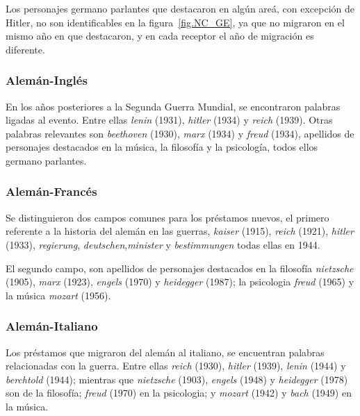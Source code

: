 Los personajes germano parlantes que destacaron en algún areá, con excepción de Hitler, no son identificables en la figura~\ref{fig.NC_GE}, ya que no migraron en el mismo año en que destacaron, y en cada receptor el año de migración es diferente. 


\subsubsection*{Alemán-Inglés}%

En los años posteriores a la Segunda Guerra Mundial, se encontraron palabras ligadas al evento. Entre ellas \textit{lenin} (1931), \textit{hitler} (1934) y \textit{reich} (1939).  Otras palabras relevantes son \textit{beethoven} (1930), \textit{marx} (1934) y \textit{freud} (1934), apellidos de personajes destacados en la música, la filosofía y la psicología, todos ellos germano parlantes.


\subsubsection*{Alemán-Francés}%


Se distinguieron dos campos comunes para los préstamos nuevos,  el primero referente a la historia del alemán en las guerras, \textit{kaiser} (1915), \textit{reich} (1921), \textit{hitler} (1933),  \textit{regierung}, \textit{deutschen},\textit{minister} y  \textit{bestimmungen} todas ellas en 1944. %

El segundo campo, son apellidos de  personajes destacados en la filosofía \textit{nietzsche} (1905),  \textit{marx} (1923), \textit{engels} (1970) y \textit{heidegger} (1987); la psicologia \textit{freud} (1965)  y  la música \textit{mozart} (1956). 



\subsubsection*{Alemán-Italiano}%

Los préstamos que migraron del alemán al italiano,  se encuentran palabras relacionadas con la guerra. Entre ellas \textit{reich} (1930),  \textit{hitler} (1939), \textit{lenin} (1944) y \textit{berchtold} (1944); mientras que 
\textit{nietzsche} (1903),  \textit{engels} (1948) y  \textit{heidegger} (1978) son de la filosofía; \textit{freud} (1970) en la psicologia; y \textit{mozart} (1942) y \textit{bach} (1949) en la música. 



